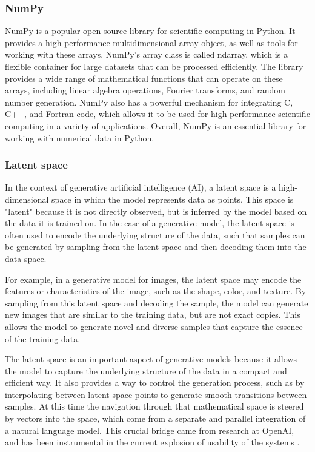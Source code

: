 \subsubsection{NumPy}
NumPy is a popular open-source library for scientific computing in Python. It provides a high-performance multidimensional array object, as well as tools for working with these arrays. NumPy's array class is called ndarray, which is a flexible container for large datasets that can be processed efficiently. The library provides a wide range of mathematical functions that can operate on these arrays, including linear algebra operations, Fourier transforms, and random number generation. NumPy also has a powerful mechanism for integrating C, C++, and Fortran code, which allows it to be used for high-performance scientific computing in a variety of applications. Overall, NumPy is an essential library for working with numerical data in Python.
\subsubsection{Latent space}
In the context of generative artificial intelligence (AI), a latent space is a high-dimensional space in which the model represents data as points. This space is "latent" because it is not directly observed, but is inferred by the model based on the data it is trained on. In the case of a generative model, the latent space is often used to encode the underlying structure of the data, such that samples can be generated by sampling from the latent space and then decoding them into the data space.

For example, in a generative model for images, the latent space may encode the features or characteristics of the image, such as the shape, color, and texture. By sampling from this latent space and decoding the sample, the model can generate new images that are similar to the training data, but are not exact copies. This allows the model to generate novel and diverse samples that capture the essence of the training data.

The latent space is an important aspect of generative models because it allows the model to capture the underlying structure of the data in a compact and efficient way. It also provides a way to control the generation process, such as by interpolating between latent space points to generate smooth transitions between samples. At this time the navigation through that mathematical space is steered by vectors into the space, which come from a separate and parallel integration of a natural language model. This crucial bridge came from research at OpenAI, and has been instrumental in the current explosion of usability of the systems \cite{radford2021learning}.
